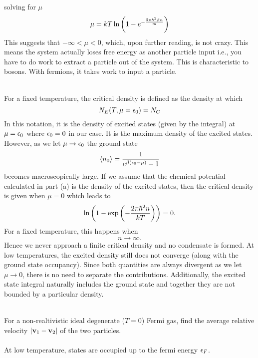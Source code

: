 \documentclass[10pt,letterpaper]{article}
\begin{document}
	solving for $\mu$
	\[
		\mu =kT\ln\left(1-  e^{-\frac{2\pi \hbar^2\beta n}{m}}\right)
	\]
	This suggests that $-\infty < \mu < 0$, which, upon further reading, is not crazy. This means the system actually 
	loses free energy as another particle input i.e., you have to do work to extract a particle out of the system. This
	is characteristic to bosons. With fermions, it takes work to input a particle. 
	\\ \\
	\item 
	For a fixed temperature, the critical density is defined as the density at which 
	\[
		N_E(T,\mu=\epsilon_0) = N_C
	\]
	In this notation, it is the density of excited states (given by the integral) at $\mu = \epsilon_0$ where
	$\epsilon_0 = 0$ in our case. It is the maximum density of the excited states. However, as we let $\mu \to \epsilon_0$
	the ground state
	\[
		\braket{n_0} = \frac{1}{e^{\beta(\epsilon_0-\mu)}-1}
	\]
	becomes macroscopically large. If we assume that the chemical potential calculated in part (a) is 
	the density of the excited states, then the critical density is given when $\mu = 0$ which leads to
	\[
		\ln\left(1-\exp\left(-\frac{2\pi\hbar^2 n}{kT}\right)\right) = 0.
	\]
	For a fixed temperature, this happens when
	\[
		n\to\infty.
	\]
	Hence we never approach a finite critical density and no condensate is formed. At low temperatures,
	the excited density still does not converge (along with the ground state occupancy). Since both
	quantities are always divergent as we let $\mu \to 0$, there is no need to separate the contributions.
	Additionally, the excited state integral naturally includes the ground state and together they 
	are not bounded by a particular density. 
	\\ \\
	\eenum
			
	\item
	For a non-realtivistic ideal degenerate ($T=0$) Fermi gas, find the average relative velocity
	$|\mathbf{v}_1-\mathbf{v}_2|$ of the two particles.
	\\ \\
	At low temperature, states are occupied up to the fermi energy $\epsilon_F$. 
	\\ \\
	
\end{document}
